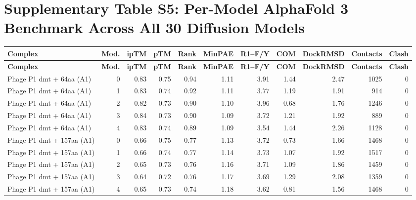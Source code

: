 \documentclass[10pt,letterpaper]{article}
\begin{document}
\section*{Supplementary Table S5: Per-Model AlphaFold 3 Benchmark Across All 30 Diffusion Models}
\vspace{3pt}
{\scriptsize\setlength{\tabcolsep}{3.5pt}\renewcommand{\arraystretch}{1.08}
\begin{longtable}{@{}lrrrrrrrrrr@{}}
\toprule
\textbf{Complex} & \textbf{Mod.} & \textbf{ipTM} & \textbf{pTM} & \textbf{Rank} & \textbf{MinPAE} & \textbf{R1--F/Y} & \textbf{COM} & \textbf{DockRMSD} & \textbf{Contacts} & \textbf{Clash} \\
\midrule
\endfirsthead
\toprule
\textbf{Complex} & \textbf{Mod.} & \textbf{ipTM} & \textbf{pTM} & \textbf{Rank} & \textbf{MinPAE} & \textbf{R1--F/Y} & \textbf{COM} & \textbf{DockRMSD} & \textbf{Contacts} & \textbf{Clash} \\
\midrule
\endhead
\bottomrule
\endfoot
Phage P1 dmt + 64aa (A1) & 0 & 0.83 & 0.75 & 0.94 & 1.11 & 3.91 & 1.44 & 2.47 & 1025 & 0 \\
Phage P1 dmt + 64aa (A1) & 1 & 0.83 & 0.74 & 0.92 & 1.11 & 3.77 & 1.19 & 1.91 & 914 & 0 \\
Phage P1 dmt + 64aa (A1) & 2 & 0.82 & 0.73 & 0.90 & 1.10 & 3.96 & 0.68 & 1.76 & 1246 & 0 \\
Phage P1 dmt + 64aa (A1) & 3 & 0.84 & 0.73 & 0.90 & 1.09 & 3.72 & 1.21 & 1.92 & 889 & 0 \\
Phage P1 dmt + 64aa (A1) & 4 & 0.83 & 0.74 & 0.89 & 1.09 & 3.54 & 1.44 & 2.26 & 1128 & 0 \\
Phage P1 dmt + 157aa (A1) & 0 & 0.66 & 0.75 & 0.77 & 1.13 & 3.72 & 0.73 & 1.66 & 1468 & 0 \\
Phage P1 dmt + 157aa (A1) & 1 & 0.66 & 0.74 & 0.77 & 1.14 & 3.73 & 1.07 & 1.92 & 1517 & 0 \\
Phage P1 dmt + 157aa (A1) & 2 & 0.65 & 0.73 & 0.76 & 1.16 & 3.71 & 1.09 & 1.86 & 1459 & 0 \\
Phage P1 dmt + 157aa (A1) & 3 & 0.64 & 0.72 & 0.76 & 1.17 & 3.69 & 1.29 & 2.08 & 1359 & 0 \\
Phage P1 dmt + 157aa (A1) & 4 & 0.65 & 0.73 & 0.74 & 1.18 & 3.62 & 0.81 & 1.56 & 1468 & 0 \\

\end{longtable}}
\end{document}
